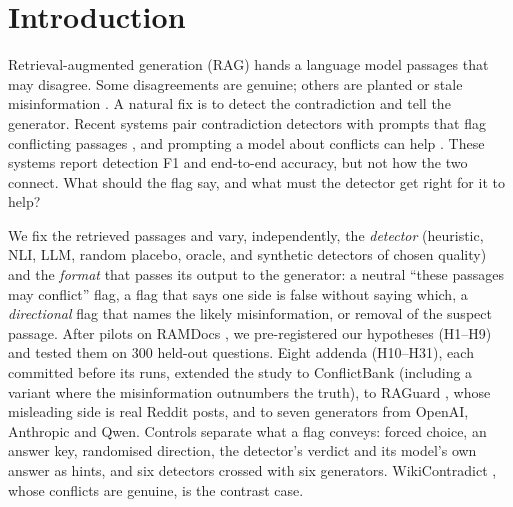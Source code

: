 \section{Introduction}

Retrieval-augmented generation (RAG) \citep{lewis2020rag} hands a language model passages that may disagree. Some
disagreements are genuine; others are planted or stale misinformation \citep{zou2025poisonedrag,wang2025madam}. A natural fix is to detect the contradiction and tell
the generator. Recent systems pair contradiction detectors with prompts that flag conflicting passages
\citep{wang2026conflictrag}, and prompting a model about conflicts can help \citep{cattan2025conflicts}. These systems
report detection F1 and end-to-end accuracy, but not how the two connect. What should the flag say, and what must the
detector get right for it to help?

We fix the retrieved passages and vary, independently, the \emph{detector} (heuristic, NLI, LLM, random placebo,
oracle, and synthetic detectors of chosen quality) and the \emph{format} that passes its output to the generator: a
neutral ``these passages may conflict'' flag, a flag that says one side is false without saying which, a
\emph{directional} flag that names the likely misinformation, or removal of the suspect passage. After pilots on
RAMDocs \citep{wang2025madam}, we pre-registered our hypotheses (H1--H9) and tested them on 300 held-out questions.
Eight addenda (H10--H31), each committed before its runs, extended the study to ConflictBank \citep{su2024conflictbank}
(including a variant where the misinformation outnumbers the truth), to RAGuard \citep{zeng2025raguard}, whose
misleading side is real Reddit posts, and to seven generators from OpenAI, Anthropic and Qwen. Controls separate what a
flag conveys: forced choice, an answer key, randomised direction, the detector's verdict and its model's own answer as
hints, and six detectors crossed with six generators. WikiContradict \citep{hou2024wikicontradict}, whose conflicts are genuine, is the contrast case.

